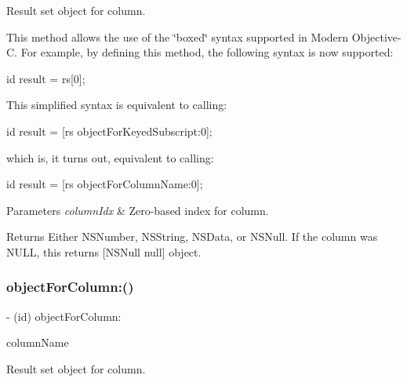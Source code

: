 Result set object for column.

This method allows the use of the \char`\"{}boxed\char`\"{} syntax supported in Modern Objective-\/C. For example, by defining this method, the following syntax is now supported\+:

id result = rs\mbox{[}0\mbox{]};

This simplified syntax is equivalent to calling\+:

id result = \mbox{[}rs object\+For\+Keyed\+Subscript\+:0\mbox{]};

which is, it turns out, equivalent to calling\+:

id result = \mbox{[}rs object\+For\+Column\+Name\+:0\mbox{]};


\begin{DoxyParams}{Parameters}
{\em column\+Idx} & Zero-\/based index for column.\\
\hline
\end{DoxyParams}
\begin{DoxyReturn}{Returns}
Either {\ttfamily N\+S\+Number}, {\ttfamily N\+S\+String}, {\ttfamily N\+S\+Data}, or {\ttfamily N\+S\+Null}. If the column was {\ttfamily N\+U\+LL}, this returns {\ttfamily \mbox{[}N\+S\+Null null\mbox{]}} object. 
\end{DoxyReturn}
\mbox{\label{interface_o_p_t_l_y_f_m_d_b_result_set_adc62819e11eff432ebf07e784e4ef86f}} 
\subsubsection{\texorpdfstring{object\+For\+Column\+:()}{objectForColumn:()}}
{\footnotesize\ttfamily -\/ (id) object\+For\+Column\+: \begin{DoxyParamCaption}\item[{(N\+S\+String$\ast$)}]{column\+Name }\end{DoxyParamCaption}}

Result set object for column.


